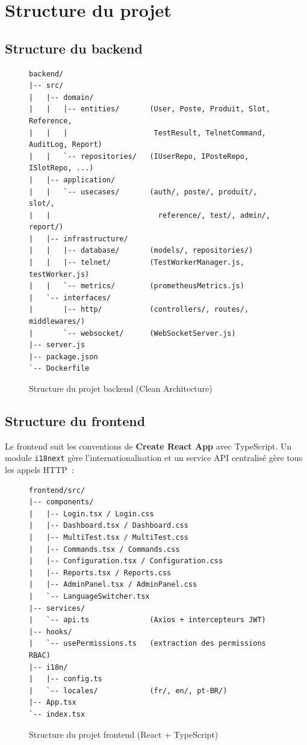 \section{Structure du projet}

\subsection{Structure du backend}

\begin{figure}[H]
  \centering
  \begin{lstlisting}[basicstyle=\ttfamily\small, frame=single, backgroundcolor=\color{gray!6}]
backend/
|-- src/
|   |-- domain/
|   |   |-- entities/       (User, Poste, Produit, Slot, Reference,
|   |   |                    TestResult, TelnetCommand, AuditLog, Report)
|   |   `-- repositories/   (IUserRepo, IPosteRepo, ISlotRepo, ...)
|   |-- application/
|   |   `-- usecases/       (auth/, poste/, produit/, slot/,
|   |                         reference/, test/, admin/, report/)
|   |-- infrastructure/
|   |   |-- database/       (models/, repositories/)
|   |   |-- telnet/         (TestWorkerManager.js, testWorker.js)
|   |   `-- metrics/        (prometheusMetrics.js)
|   `-- interfaces/
|       |-- http/           (controllers/, routes/, middlewares/)
|       `-- websocket/      (WebSocketServer.js)
|-- server.js
|-- package.json
`-- Dockerfile
  \end{lstlisting}
  \caption{Structure du projet backend (Clean Architecture)}
  \label{fig:backend_structure}
\end{figure}

\subsection{Structure du frontend}

Le frontend suit les conventions de \textbf{Create React App} avec
TypeScript. Un module \texttt{i18next} gère l'internationalisation et
un service API centralisé gère tous les appels HTTP~:

\begin{figure}[H]
  \centering
  \begin{lstlisting}[basicstyle=\ttfamily\small, frame=single, backgroundcolor=\color{gray!6}]
frontend/src/
|-- components/
|   |-- Login.tsx / Login.css
|   |-- Dashboard.tsx / Dashboard.css
|   |-- MultiTest.tsx / MultiTest.css
|   |-- Commands.tsx / Commands.css
|   |-- Configuration.tsx / Configuration.css
|   |-- Reports.tsx / Reports.css
|   |-- AdminPanel.tsx / AdminPanel.css
|   `-- LanguageSwitcher.tsx
|-- services/
|   `-- api.ts              (Axios + intercepteurs JWT)
|-- hooks/
|   `-- usePermissions.ts   (extraction des permissions RBAC)
|-- i18n/
|   |-- config.ts
|   `-- locales/            (fr/, en/, pt-BR/)
|-- App.tsx
`-- index.tsx
  \end{lstlisting}
  \caption{Structure du projet frontend (React + TypeScript)}
  \label{fig:frontend_structure}
\end{figure}

